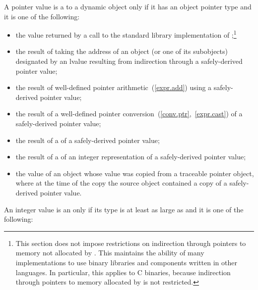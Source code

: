 \pnum
{}%
A pointer value is a  to a dynamic object only if it
has an object pointer type and it is one of the following:

\begin{itemize}
\item the value returned by a call to the \Cpp standard library implementation of
;\footnote{This section does not impose restrictions
on indirection through pointers to memory not allocated by . This
maintains the ability of many \Cpp implementations to use binary libraries and
components written in other languages. In particular, this applies to C binaries,
because indirection through pointers to memory allocated by  is not restricted.}

\item the result of taking the address of an object (or one of its
  subobjects) designated by an lvalue resulting from indirection
  through a safely-derived pointer value;

\item the result of well-defined pointer arithmetic~(\ref{expr.add}) using a safely-derived pointer
value;

\item the result of a well-defined pointer
conversion~(\ref{conv.ptr},~\ref{expr.cast}) of a safely-derived pointer value;

\item the result of a  of a safely-derived pointer value;

\item the result of a  of an integer representation of a
safely-derived pointer value;

\item the value of an object whose value was copied from a traceable pointer object,
where at the time of the copy the source object contained a copy of a safely-derived
pointer value.
\end{itemize}

\pnum
{}%
%
%
An integer value is an 
only if its type is at least as large as  and it is one of the
following:

